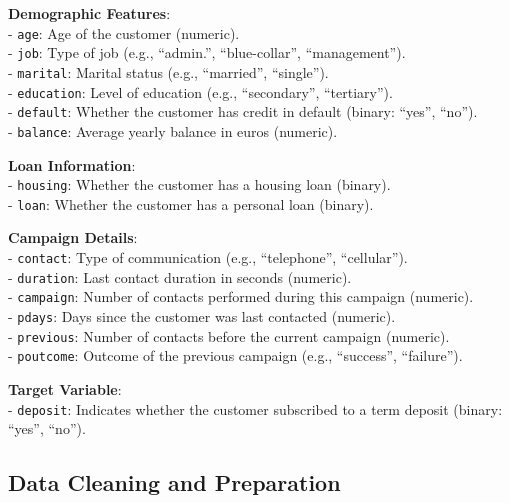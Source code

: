 \documentclass[
]{book}
\newcommand{\passthrough}[1]{#1}
\theoremstyle{definition}
\theoremstyle{definition}
\theoremstyle{definition}
\theoremstyle{definition}
\theoremstyle{remark}
\begin{document}
\textbf{Demographic Features}:\\
- \passthrough{\lstinline!age!}: Age of the customer (numeric).\\
- \passthrough{\lstinline!job!}: Type of job (e.g., ``admin.'', ``blue-collar'', ``management'').\\
- \passthrough{\lstinline!marital!}: Marital status (e.g., ``married'', ``single'').\\
- \passthrough{\lstinline!education!}: Level of education (e.g., ``secondary'', ``tertiary'').\\
- \passthrough{\lstinline!default!}: Whether the customer has credit in default (binary: ``yes'', ``no'').\\
- \passthrough{\lstinline!balance!}: Average yearly balance in euros (numeric).

\textbf{Loan Information}:\\
- \passthrough{\lstinline!housing!}: Whether the customer has a housing loan (binary).\\
- \passthrough{\lstinline!loan!}: Whether the customer has a personal loan (binary).

\textbf{Campaign Details}:\\
- \passthrough{\lstinline!contact!}: Type of communication (e.g., ``telephone'', ``cellular'').\\
- \passthrough{\lstinline!duration!}: Last contact duration in seconds (numeric).\\
- \passthrough{\lstinline!campaign!}: Number of contacts performed during this campaign (numeric).\\
- \passthrough{\lstinline!pdays!}: Days since the customer was last contacted (numeric).\\
- \passthrough{\lstinline!previous!}: Number of contacts before the current campaign (numeric).\\
- \passthrough{\lstinline!poutcome!}: Outcome of the previous campaign (e.g., ``success'', ``failure'').

\textbf{Target Variable}:\\
- \passthrough{\lstinline!deposit!}: Indicates whether the customer subscribed to a term deposit (binary: ``yes'', ``no'').

\subsection*{Data Cleaning and Preparation}\label{data-cleaning-and-preparation-1}
\end{document}
